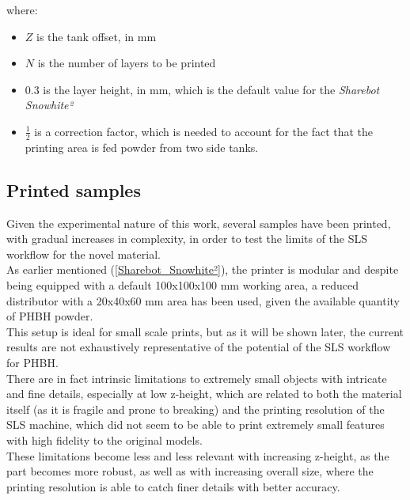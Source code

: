 \documentclass{article}
\begin{document}
        
        where:
        \begin{itemize}
            \item $Z$ is the tank offset, in mm
            \item $N$ is the number of layers to be printed 
            \item $0.3$ is the layer height, in mm, which is the default value for the \textit{Sharebot Snowhite²}
            \item $\frac{1}{2}$ is a correction factor, which is needed to account for the fact that the printing area is fed powder 
            from two side tanks.
        \end{itemize}
        



        \clearpage
        \subsection{Printed samples\label{Printed_samples}}

        Given the experimental nature of this work, several samples have been printed, with gradual 
        increases in complexity, in order to test the limits of the SLS workflow for the novel material. \\ 

        As earlier mentioned (\ref{Sharebot_Snowhite²}), the printer is modular and despite being equipped 
        with a default 100x100x100 mm working area, a reduced distributor with a 20x40x60 mm area has been used, 
        given the available quantity of PHBH powder. \\ 

        This setup is ideal for small scale prints, but as it will be shown later, the current results 
        are not exhaustively representative of the potential of the SLS workflow for PHBH. \\

        There are in fact intrinsic limitations to extremely small objects with intricate and fine details,
        especially at low z-height, which are related to both the material itself (as it is fragile and prone to 
        breaking) and the printing resolution of the SLS machine, which 
        did not seem to be able to print extremely small features with high fidelity to the original models. \\

        These limitations become less and less relevant with increasing z-height, as the part becomes 
        more robust, as well as with increasing overall size, where the printing resolution 
        is able to catch finer details with better accuracy. \\
\end{document}

